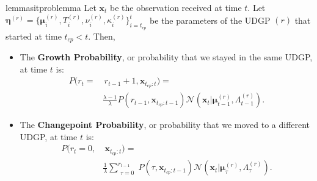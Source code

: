 \documentclass[Afour,sageh,times]{sagej}
\theoremstyle{lemma}
\begin{document}
\begin{restatable}{lemma}{sitproblemma} \label{lemma:sit-prob}
        Let $\boldsymbol{x}_t$ be the observation received at time $t$. Let $\boldsymbol{\eta}^{(r)} = \{\boldsymbol{\mu}_{i}^{(r)}, T_{i}^{(r)}, \nu_{i}^{(r)}, \kappa_{i}^{(r)}\}_{i=t_{cp}}^{t}$ be the parameters of the UDGP $(r)$ that started at time $t_{cp} < t$. Then, 
        \begin{itemize}[leftmargin=0.45cm]
            \item The \textbf{Growth Probability}, or probability that we stayed in the same UDGP, at time $t$ is: %
            \begin{align} \label{eq:permanence-prob}
                P(r_t = &~r_{t-1} + 1, \boldsymbol{x}_{t_{cp}:t}) = \\ &\frac{\lambda - 1}{\lambda} P(r_{t-1}, \boldsymbol{x}_{t_{cp}:t-1})  
                \mathcal{N} (\boldsymbol{x}_t | \boldsymbol{\mu}_{t-1}^{(r)}, \Lambda_{t-1}^{(r)}). \nonumber
            \end{align}
            \item The \textbf{Changepoint Probability}, or probability that we moved to a different UDGP, at time $t$ is:
            \begin{align} \label{eq:jump-prob}
                P(r_t = 0, &~\boldsymbol{x}_{t_{cp}:t}) = \\ & \frac{1}{\lambda} \sum_{\substack{\tau = 0}}^{r_{t-1}} P(\tau, \boldsymbol{x}_{t_{cp}:t-1}) 
                \mathcal{N} (\boldsymbol{x}_t | \boldsymbol{\mu}_{\tau}^{(r)}, \Lambda_{\tau}^{(r)}). \nonumber
            \end{align}
        \end{itemize}
\end{restatable}
\end{document}
